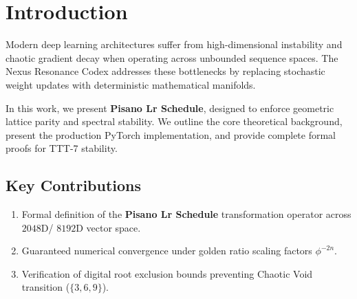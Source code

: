 \section{Introduction}
Modern deep learning architectures suffer from high-dimensional instability and chaotic gradient decay when operating across unbounded sequence spaces. The Nexus Resonance Codex addresses these bottlenecks by replacing stochastic weight updates with deterministic mathematical manifolds.

In this work, we present \textbf{Pisano Lr Schedule}, designed to enforce geometric lattice parity and spectral stability. We outline the core theoretical background, present the production PyTorch implementation, and provide complete formal proofs for TTT-7 stability.

\subsection{Key Contributions}
\begin{enumerate}[label=\textbf{\arabic*.}]
    \item Formal definition of the \textbf{Pisano Lr Schedule} transformation operator across $2048$D/ $8192$D vector space.
    \item Guaranteed numerical convergence under golden ratio scaling factors $\phi^{-2n}$.
    \item Verification of digital root exclusion bounds preventing Chaotic Void transition ($\{3, 6, 9\}$).
\end{enumerate}